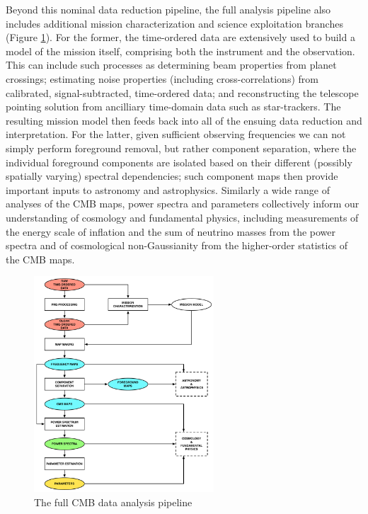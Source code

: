 Beyond this nominal data reduction pipeline, the full analysis pipeline also includes additional mission characterization and science exploitation branches (Figure \ref{fig_da}). For the former, the time-ordered data are extensively used to build a model of the mission itself, comprising both the instrument and the observation. This can include such processes as determining beam properties from planet crossings; estimating noise properties (including cross-correlations) from calibrated, signal-subtracted, time-ordered data; and reconstructing the telescope pointing solution from ancilliary time-domain data such as star-trackers. The resulting mission model then feeds back into all of the ensuing data reduction and interpretation. For the latter, given sufficient observing frequencies we can not simply perform foreground removal, but rather component separation, where the individual foreground components are isolated based on their different (possibly spatially varying) spectral dependencies; such component maps then provide important inputs to astronomy and astrophysics. Similarly a wide range of analyses of the CMB maps, power spectra and parameters collectively inform our understanding of cosmology and fundamental physics, including measurements of the energy scale of inflation and the sum of neutrino masses from the power spectra and of cosmological non-Gaussianity from the higher-order statistics of the CMB maps.

\begin{figure}[htbp]
\begin{center}
\hspace*{2.6in}\includegraphics[width=0.6\textwidth]{Analysis/da}
\caption{The full CMB data analysis pipeline}
\label{fig_da}
\end{center}
\end{figure}


